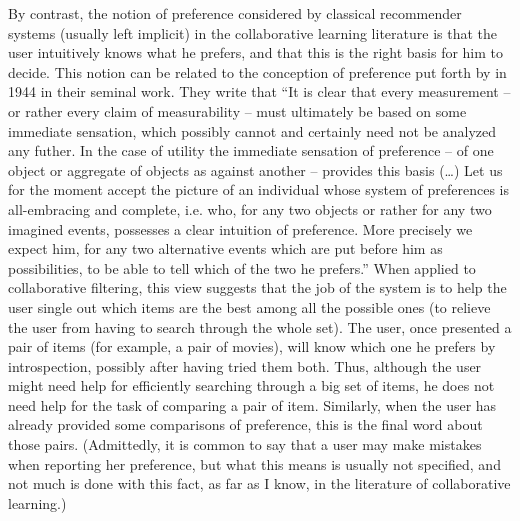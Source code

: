\documentclass[french, english]{da2pl2018}
\begin{document}
By contrast, the notion of preference considered by classical recommender systems (usually left implicit) in the collaborative learning literature is that the user intuitively knows what he prefers, and that this is the right basis for him to decide. This notion can be related to the conception of preference put forth by \citet{von_neumann_theory_2004} in 1944 in their seminal work. They write that “It is clear that every measurement – or rather every claim of measurability – must ultimately be based on some immediate sensation, which possibly cannot and certainly need not be analyzed any futher. In the case of utility the immediate sensation of preference – of one object or aggregate of objects as against another – provides this basis (…) Let us for the moment accept the picture of an individual whose system of preferences is all-embracing and complete, i.e. who, for any two objects or rather for any two imagined events, possesses a clear intuition of preference. More precisely we expect him, for any two alternative events which are put before him as possibilities, to be able to tell which of the two he prefers.” When applied to collaborative filtering, this view suggests that the job of the system is to help the user single out which items are the best among all the possible ones (to relieve the user from having to search through the whole set). The user, once presented a pair of items (for example, a pair of movies), will know which one he prefers by introspection, possibly after having tried them both. Thus, although the user might need help for efficiently searching through a big set of items, he does not need help for the task of comparing a pair of item. Similarly, when the user has already provided some comparisons of preference, this is the final word about those pairs. (Admittedly, it is common to say that a user may make mistakes when reporting her preference, but what this means is usually not specified, and not much is done with this fact, as far as I know, in the literature of collaborative learning.)
\end{document}
